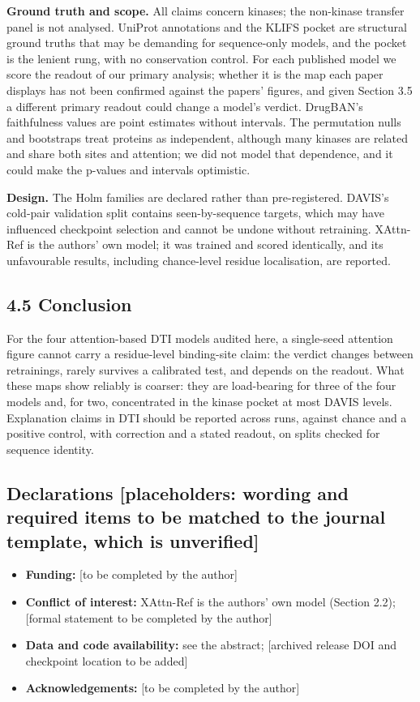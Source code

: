 \documentclass[
  11pt,
]{article}
\providecommand{\tightlist}{%
  \setlength{\itemsep}{0pt}\setlength{\parskip}{0pt}}
\begin{document}
\textbf{Ground truth and scope.} All claims concern kinases; the non-kinase transfer panel is not analysed. UniProt annotations and the KLIFS pocket are structural ground truths that may be demanding for sequence-only models, and the pocket is the lenient rung, with no conservation control. For each published model we score the readout of our primary analysis; whether it is the map each paper displays has not been confirmed against the papers' figures, and given Section 3.5 a different primary readout could change a model's verdict. DrugBAN's faithfulness values are point estimates without intervals. The permutation nulls and bootstraps treat proteins as independent, although many kinases are related and share both sites and attention; we did not model that dependence, and it could make the p-values and intervals optimistic.

\textbf{Design.} The Holm families are declared rather than pre-registered. DAVIS's cold-pair validation split contains seen-by-sequence targets, which may have influenced checkpoint selection and cannot be undone without retraining. XAttn-Ref is the authors' own model; it was trained and scored identically, and its unfavourable results, including chance-level residue localisation, are reported.

\subsection{4.5 Conclusion}\label{conclusion}

For the four attention-based DTI models audited here, a single-seed attention figure cannot carry a residue-level binding-site claim: the verdict changes between retrainings, rarely survives a calibrated test, and depends on the readout. What these maps show reliably is coarser: they are load-bearing for three of the four models and, for two, concentrated in the kinase pocket at most DAVIS levels. Explanation claims in DTI should be reported across runs, against chance and a positive control, with correction and a stated readout, on splits checked for sequence identity.

\subsection{Declarations {[}placeholders: wording and required items to be matched to the journal template, which is unverified{]}}\label{declarations-placeholders-wording-and-required-items-to-be-matched-to-the-journal-template-which-is-unverified}

\begin{itemize}
\tightlist
\item
  \textbf{Funding:} {[}to be completed by the author{]}
\item
  \textbf{Conflict of interest:} XAttn-Ref is the authors' own model (Section 2.2); {[}formal statement to be completed by the author{]}
\item
  \textbf{Data and code availability:} see the abstract; {[}archived release DOI and checkpoint location to be added{]}
\item
  \textbf{Acknowledgements:} {[}to be completed by the author{]}
\end{itemize}


\end{document}
